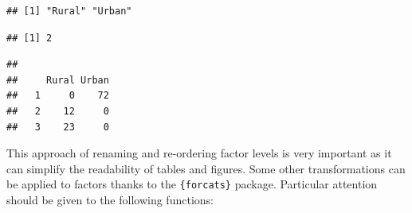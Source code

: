 \documentclass[
]{krantz}
\makeatletter
\newenvironment{Shaded}{\begin{snugshade}}{\end{snugshade}}
\newcommand{\AttributeTok}[1]{\textcolor[rgb]{0.61,0.61,0.61}{#1}}
\newcommand{\DecValTok}[1]{\textcolor[rgb]{0.06,0.06,0.06}{#1}}
\newcommand{\FunctionTok}[1]{\textcolor[rgb]{0,0,0}{#1}}
\newcommand{\NormalTok}[1]{#1}
\newcommand{\OtherTok}[1]{\textcolor[rgb]{0.37,0.37,0.37}{#1}}
\newcommand{\SpecialCharTok}[1]{\textcolor[rgb]{0,0,0}{#1}}
\newcommand{\StringTok}[1]{\textcolor[rgb]{0.5,0.5,0.5}{#1}}
\newenvironment{kframe}{%
\medskip{}
\setlength{\fboxsep}{.8em}
 \def\at@end@of@kframe{}%
 \ifinner\ifhmode%
  \def\at@end@of@kframe{\end{minipage}}%
  \begin{minipage}{\columnwidth}%
 \fi\fi%
 \def\FrameCommand##1{\hskip\@totalleftmargin \hskip-\fboxsep
 \colorbox{shadecolor}{##1}\hskip-\fboxsep
     \hskip-\linewidth \hskip-\@totalleftmargin \hskip\columnwidth}%
 \MakeFramed {\advance\hsize-\width
   \@totalleftmargin\z@ \linewidth\hsize
   \@setminipage}}%
 {\par\unskip\endMakeFramed%
 \at@end@of@kframe}
\renewenvironment{Shaded}{\begin{kframe}}{\end{kframe}}
\makeatother
\begin{document}
\begin{Shaded}
\end{Shaded}

\begin{verbatim}
## [1] "Rural" "Urban"
\end{verbatim}

\begin{Shaded}
\end{Shaded}

\begin{verbatim}
## [1] 2
\end{verbatim}

\begin{Shaded}
\end{Shaded}

\begin{verbatim}
##    
##     Rural Urban
##   1     0    72
##   2    12     0
##   3    23     0
\end{verbatim}

This approach of renaming and re-ordering factor levels is very important as it can simplify the readability of tables and figures.
Some other transformations can be applied to factors thanks to the \texttt{\{forcats\}} package. Particular attention should be given to the following functions:
\end{document}
